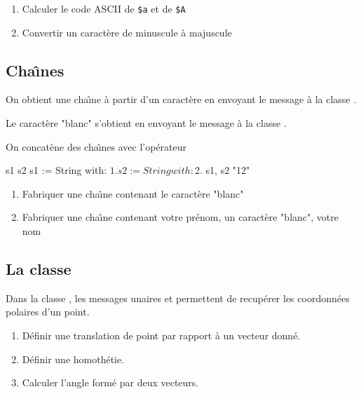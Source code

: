 \begin{enumerate}
\item Calculer le code ASCII de \verb|$a| et de \verb|$A|
\item Convertir un caract\`ere de minuscule \`a majuscule
\end{enumerate}

\subsection{Cha\^{\i}nes}

On obtient une cha\^{\i}ne \`a partir d'un caract\`ere en envoyant
le message  \`a la classe .

Le caract\`ere "blanc" s'obtient en envoyant le message  \`a la classe .

On concat\`ene des cha\^{\i}nes avec l'op\'erateur \ct{,}

\begin{scode}
\stBar s1 s2 \stBar
s1 := String with: $1.
s2 := String with: $2.
s1, s2        "12"
\end{scode}

\begin{enumerate}
\item Fabriquer une cha\^{\i}ne contenant le caract\`ere "blanc"
\item Fabriquer une cha\^{\i}ne contenant votre pr\'enom, un caract\`ere
"blanc", votre nom
\end{enumerate}
 

\subsection{La classe }
Dans la classe , les messages unaires  et  permettent de recup\'erer les coordonn\'ees polaires d'un point.

\begin{enumerate}
\item D\'efinir une translation de point par rapport \`a un vecteur donn\'e.
\item D\'efinir une homoth\'etie. 
\item Calculer l'angle form\'e par deux vecteurs.
\end{enumerate}



\ifx\wholebook\relax\else\fi








